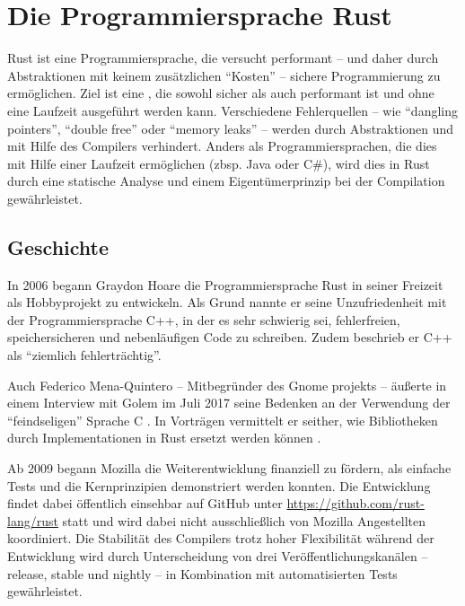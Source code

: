 
\chapter{Die Programmiersprache Rust}

Rust ist eine Programmiersprache, die versucht performant -- und daher durch Abstraktionen mit keinem zusätzlichen \enquote{Kosten}  -- sichere Programmierung zu ermöglichen.
Ziel ist eine , die sowohl sicher  als auch performant ist und ohne eine Laufzeit ausgeführt werden kann.
Verschiedene Fehlerquellen -- wie \enquote{dangling pointers}, \enquote{double free} oder \enquote{memory leaks}  --  werden durch Abstraktionen und mit Hilfe des Compilers verhindert.
Anders als Programmiersprachen, die dies mit Hilfe einer Laufzeit ermöglichen (zbsp. Java oder C\#), wird dies in Rust durch eine statische Analyse und einem Eigentümerprinzip bei der Compilation gewährleistet.


\section{Geschichte}
\label{rust:history}

In 2006 \cite{rust:faq} begann Graydon Hoare die Programmiersprache Rust in seiner Freizeit als Hobbyprojekt zu entwickeln.
Als Grund nannte er seine Unzufriedenheit mit der Programmiersprache C++, in der es sehr schwierig sei, fehlerfreien, speichersicheren und nebenläufigen Code zu schreiben.
Zudem beschrieb er C++ als \enquote{ziemlich fehlerträchtig}. \cite{rust:heise_interview_graydon}

Auch Federico Mena-Quintero -- Mitbegründer des Gnome projekts  --
äußerte in einem Interview mit Golem im Juli 2017 seine Bedenken an der Verwendung der \enquote{feindseligen} Sprache C \cite{rust:c_is_hostile_golem}.
In Vorträgen  vermittelt er seither, wie Bibliotheken durch Implementationen in Rust ersetzt werden können \cite{rust:c_is_hostile_mena}.

Ab 2009 begann Mozilla die Weiterentwicklung finanziell zu fördern, als einfache Tests und die Kernprinzipien demonstriert werden konnten.
Die Entwicklung findet dabei öffentlich einsehbar auf GitHub unter \url{https://github.com/rust-lang/rust} statt und wird dabei nicht ausschließlich von Mozilla Angestellten koordiniert.
Die Stabilität des Compilers trotz hoher Flexibilität während der Entwicklung wird durch Unterscheidung von drei Veröffentlichungskanälen -- release, stable und nightly -- in Kombination mit automatisierten Tests  gewährleistet. \cite{rust:faq}



